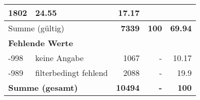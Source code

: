 \begin{longtable}{lXrrr}
       \num{1802} &
       \num[round-mode=places,round-precision=2]{24.55} &
         \num[round-mode=places,round-precision=2]{17.17} \\
     \midrule
     \multicolumn{2}{l}{Summe (gültig)} &
       \textbf{\num{7339}} &
     \textbf{\num{100}} &
       \textbf{\num[round-mode=places,round-precision=2]{69.94}} \\
     \multicolumn{5}{l}{\textbf{Fehlende Werte}}\\
       -998 &
       keine Angabe &
         \num{1067} &
        - &
         \num[round-mode=places,round-precision=2]{10.17} \\
       -989 &
       filterbedingt fehlend &
         \num{2088} &
        - &
         \num[round-mode=places,round-precision=2]{19.9} \\
     \midrule
     \multicolumn{2}{l}{\textbf{Summe (gesamt)}} &
          \textbf{\num{10494}} &
        \textbf{-} &
        \textbf{\num{100}} \\
     \bottomrule
     \end{longtable}
     
